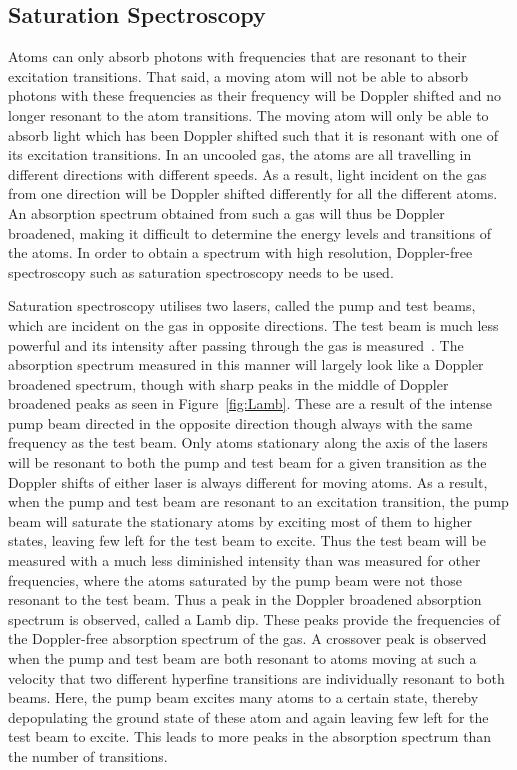 \documentclass[twocolumn]{article}
\begin{document}
\subsection{Saturation Spectroscopy}
Atoms can only absorb photons with frequencies that are resonant to their excitation transitions. That said, a moving atom will not be able to absorb photons with these frequencies as their frequency will be Doppler shifted and no longer resonant to the atom transitions. The moving atom will only be able to absorb light which has been Doppler shifted such that it is resonant with one of its excitation transitions. In an uncooled gas, the atoms are all travelling in different directions with different speeds. As a result, light incident on the gas from one direction will be Doppler shifted differently for all the different atoms. An absorption spectrum obtained from such a gas will thus be Doppler broadened, making it difficult to determine the energy levels and transitions of the atoms. In order to obtain a spectrum with high resolution, Doppler-free spectroscopy such as saturation spectroscopy needs to be used. \\
\par Saturation spectroscopy utilises two lasers, called the pump and test beams, which are incident on the gas in opposite directions. The test beam is much less powerful and its intensity after passing through the gas is measured~\cite{manual}. The absorption spectrum measured in this manner will largely look like a Doppler broadened spectrum, though with sharp peaks in the middle of Doppler broadened peaks as seen in Figure~\ref{fig:Lamb}. These are a result of the intense pump beam directed in the opposite direction though always with the same frequency as the test beam. Only atoms stationary along the axis of the lasers will be resonant to both the pump and test beam for a given transition as the Doppler shifts of either laser is always different for moving atoms. As a result, when the pump and test beam are resonant to an excitation transition, the pump beam will saturate the stationary atoms by exciting most of them to higher states, leaving few left for the test beam to excite. Thus the test beam will be measured with a much less diminished intensity than was measured for other frequencies, where the atoms saturated by the pump beam were not those resonant to the test beam. Thus a peak in the Doppler broadened absorption spectrum is observed, called a Lamb dip. These peaks provide the frequencies of the Doppler-free absorption spectrum of the gas. A crossover peak is observed when the pump and test beam are both resonant to atoms moving at such a velocity that two different hyperfine transitions are individually resonant to both beams. Here, the pump beam excites many atoms to a certain state, thereby depopulating the ground state of these atom and again leaving few left for the test beam to excite. This leads to more peaks in the absorption spectrum than the number of transitions.
\end{document}

